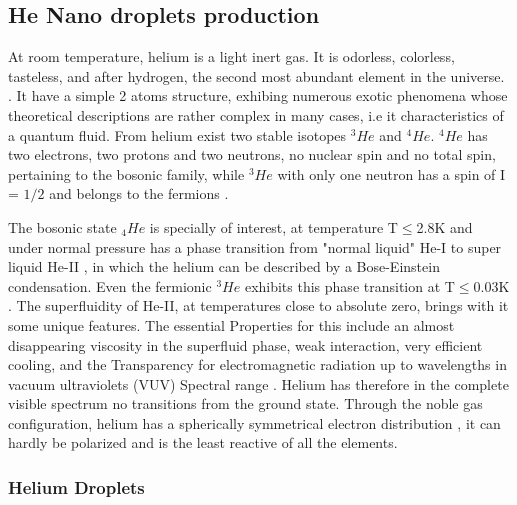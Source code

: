 \subsection{He Nano droplets production}

At room temperature, helium is a light inert gas. It is odorless, colorless, tasteless, and after hydrogen, the second most abundant element in the universe.  \cite{enss_low-temperature_2005}. It have a simple 2 atoms structure, exhibing numerous exotic phenomena whose theoretical descriptions are rather complex in many cases, i.e it characteristics of  a quantum fluid. From helium exist  two stable isotopes $^{3}He$ and $^{4}He$.  $^{4}He$ has two electrons, two protons and two neutrons, no nuclear spin and no total spin, pertaining to the bosonic family, while $^{3}He$ with only one neutron has a spin of I = $1/2$ and belongs to the fermions \cite{atkins_liquid_2014}.

The bosonic state $_{4}He$ is specially of interest, at  temperature T$\leqslant$2.8K and under normal pressure has a phase transition from "normal liquid" He-I to super liquid He-II \cite{swenson_liquid-solid_1950}, in which the helium can be described by a Bose-Einstein condensation. Even the fermionic $^{3}He$ exhibits this phase transition at T$\leqslant$0.03K \cite{halperin_properties_1978}.
The superfluidity of He-II, at temperatures close to absolute zero, brings with it some unique features. The essential Properties for this include an almost disappearing viscosity in the superfluid phase, weak interaction, very efficient cooling, and the Transparency for electromagnetic radiation up to wavelengths in vacuum ultraviolets (VUV) Spectral range \citep{enss_low-temperature_2005}. Helium has therefore in the complete visible spectrum no transitions from the ground state. Through the noble gas configuration, helium has a spherically symmetrical electron distribution \cite{lewis_helium_2014}, it can hardly be polarized and is the least reactive of all the elements.




\subsubsection{Helium Droplets}

